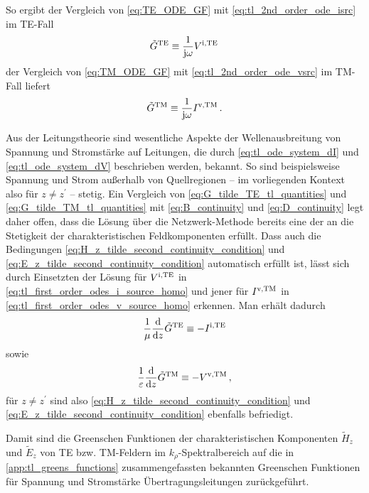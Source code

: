 So ergibt der Vergleich von \eqref{eq:TE_ODE_GF} mit \eqref{eq:tl_2nd_order_ode_isrc} im TE-Fall
\begin{equation}\label{eq:G_tilde_TE_tl_quantities}
	\tilde{G}^{\mathrm{TE}} \equiv \frac{1}{\mathrm{j} \omega} V^{\mathrm{i},\mathrm{TE}} \,
\end{equation}
der Vergleich von \eqref{eq:TM_ODE_GF} mit \eqref{eq:tl_2nd_order_ode_vsrc} im TM-Fall liefert
\begin{equation}\label{eq:G_tilde_TM_tl_quantities}
	\tilde{G}^{\mathrm{TM}} \equiv \frac{1}{\mathrm{j} \omega} I^{\mathrm{v},\mathrm{TM}} \, .
\end{equation}

Aus der Leitungstheorie \cite{Pozar2011} sind wesentliche Aspekte der Wellenausbreitung von Spannung und Stromstärke auf Leitungen, die durch \eqref{eq:tl_ode_system_dI} und \eqref{eq:tl_ode_system_dV} beschrieben werden, bekannt. So sind beispielsweise Spannung und Strom außerhalb von Quellregionen -- im vorliegenden Kontext also für $z \neq z^\prime$ -- stetig. Ein Vergleich von \eqref{eq:G_tilde_TE_tl_quantities} und \eqref{eq:G_tilde_TM_tl_quantities} mit \eqref{eq:B_continuity} und \eqref{eq:D_continuity} legt daher offen, dass die Lösung über die Netzwerk-Methode bereits eine der an die Stetigkeit der charakteristischen Feldkomponenten erfüllt. Dass auch die Bedingungen \eqref{eq:H_z_tilde_second_continuity_condition} und \eqref{eq:E_z_tilde_second_continuity_condition} automatisch erfüllt ist, lässt sich durch Einsetzten der Lösung für $V^{\mathrm{i},\mathrm{TE}}$ in \eqref{eq:tl_first_order_odes_i_source_homo} und jener für $I^{\mathrm{v},\mathrm{TM}}$ in \eqref{eq:tl_first_order_odes_v_source_homo} erkennen. Man erhält dadurch
\begin{equation}
	\frac{1}{\mu} \frac{\mathrm{d}}{\mathrm{d} z} \tilde{G}^{\mathrm{TE}} \equiv - I^{\mathrm{i},\mathrm{TE}}
\end{equation}
sowie
\begin{equation}
	\frac{1}{\varepsilon} \frac{\mathrm{d}}{\mathrm{d} z} \tilde{G}^{\mathrm{TM}} \equiv - V^{\mathrm{v},\mathrm{TM}} \,,
\end{equation}
für $z \neq z^\prime$ sind also \eqref{eq:H_z_tilde_second_continuity_condition} und \eqref{eq:E_z_tilde_second_continuity_condition} ebenfalls befriedigt.

Damit sind die Greenschen Funktionen der charakteristischen Komponenten $\tilde{H}_z$ und $\tilde{E}_z$ von TE bzw. TM-Feldern im $k_\rho$-Spektralbereich auf die in \cref{app:tl_greens_functions} zusammengefassten bekannten Greenschen Funktionen für Spannung und Stromstärke Übertragungsleitungen zurückgeführt.

